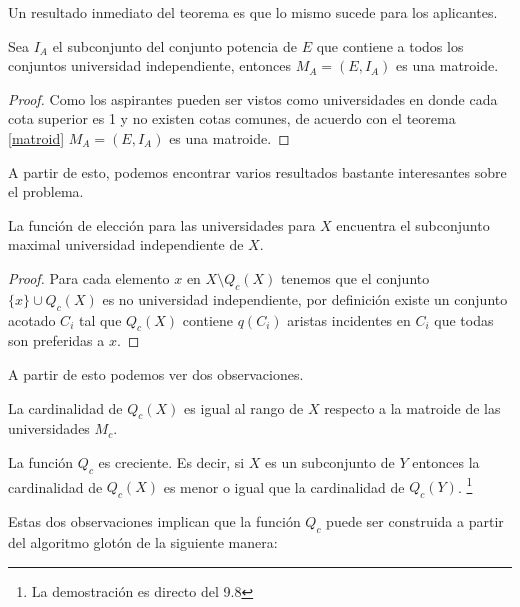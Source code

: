 Un resultado inmediato del teorema es que lo mismo sucede para los aplicantes. 

\begin{cor}
Sea $I_A$ el subconjunto del conjunto potencia de $E$ que contiene a todos los conjuntos universidad independiente, entonces $M_A = (E,I_A)$ es una matroide. 
\end{cor}
\begin{proof}
Como los aspirantes pueden ser vistos como universidades en donde cada cota superior es 1 y no existen cotas comunes, de acuerdo con el teorema \ref{matroid} $M_A = (E,I_A)$ es una matroide. 
\end{proof}

A partir de esto, podemos encontrar varios resultados bastante interesantes sobre el problema. 

\begin{cor}
La función de elección para las universidades para $X$ encuentra el subconjunto maximal universidad independiente de $X$.
\end{cor}

\begin{proof}
Para cada elemento $x$ en $X\setminus Q_c(X)$ tenemos que el conjunto $\{x\}\cup Q_c(X)$ es no universidad independiente, por definición existe un conjunto acotado $C_i$ tal que $Q_c(X)$ contiene $q(C_i)$ aristas incidentes en $C_i$ que todas son preferidas a $x$.
\end{proof}

A partir de esto podemos ver dos observaciones.

\begin{obs}
La cardinalidad de $Q_c(X)$ es igual al rango de $X$ respecto a la matroide de las universidades $M_c$. 
\end{obs}

\begin{obs}
La función $Q_c$ es creciente. Es decir, si $X$ es un subconjunto de $Y$ entonces la cardinalidad de $Q_c(X)$ es menor o igual que la cardinalidad de $Q_c(Y)$. \footnote{La demostración es directo del 9.8 } %
\end{obs} 

Estas dos observaciones implican que la función $Q_c$ puede ser construida a partir del algoritmo glotón de la siguiente manera:

